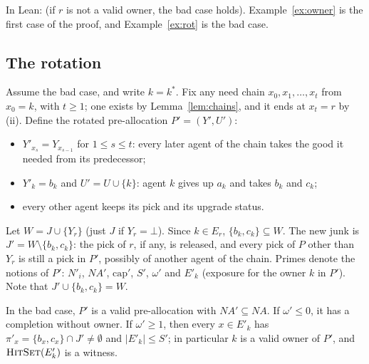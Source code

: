 \documentclass[runningheads,11pt]{llncs}
\newcommand{\NA}{\mathit{NA}}
\newcommand{\capa}{\mathrm{cap}}
\newcommand{\none}{\bot}
\newcommand{\HitSet}{\textup{\textsc{HitSet}}}
\begin{document}
\noindent In Lean:  (if $r$ is not a valid owner, the bad case holds). Example~\ref{ex:owner} is the first case of the proof, and Example~\ref{ex:rot} is the bad case.

\subsection{The rotation}\label{sec:thmB}

Assume the bad case, and write $k=k^*$. Fix any need chain $x_0,x_1,\dots,x_t$ from $x_0=k$, with $t\ge1$; one exists by Lemma~\ref{lem:chains}, and it ends at $x_t=r$ by (ii). Define the rotated pre-allocation $P'=(Y',U')$:
\begin{itemize}
\item $Y'_{x_s}=Y_{x_{s-1}}$ for $1\le s\le t$: every later agent of the chain takes the good it needed from its predecessor;
\item $Y'_k=b_k$ and $U'=U\cup\{k\}$: agent $k$ gives up $a_k$ and takes $b_k$ and $c_k$;
\item every other agent keeps its pick and its upgrade status.
\end{itemize}
Let $W=J\cup\{Y_r\}$ (just $J$ if $Y_r=\none$). Since $k\in E_r$, $\{b_k,c_k\}\subseteq W$. The new junk is $J'=W\setminus\{b_k,c_k\}$: the pick of $r$, if any, is released, and every pick of $P$ other than $Y_r$ is still a pick in $P'$, possibly of another agent of the chain. Primes denote the notions of $P'$: $N'_i$, $\NA'$, $\capa'$, $S'$, $\omega'$ and $E'_k$ (exposure for the owner $k$ in $P'$). Note that $J'\cup\{b_k,c_k\}=W$.

\begin{theorem}\label{thm:B}
In the bad case, $P'$ is a valid pre-allocation with $\NA'\subseteq\NA$. If $\omega'\le0$, it has a completion without owner. If $\omega'\ge1$, then every $x\in E'_k$ has $\pi'_x=\{b_x,c_x\}\cap J'\ne\emptyset$ and $|E'_k|\le S'$; in particular $k$ is a valid owner of $P'$, and $\HitSet(E'_k)$ is a witness.
\end{theorem}
\end{document}
